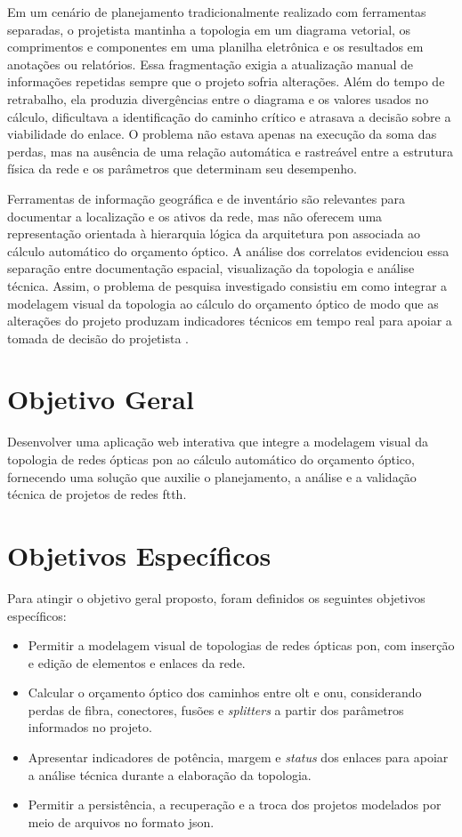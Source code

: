 Em um cenário de planejamento tradicionalmente realizado com ferramentas separadas, o projetista mantinha a topologia em um diagrama vetorial, os comprimentos e componentes em uma planilha eletrônica e os resultados em anotações ou relatórios. Essa fragmentação exigia a atualização manual de informações repetidas sempre que o projeto sofria alterações. Além do tempo de retrabalho, ela produzia divergências entre o diagrama e os valores usados no cálculo, dificultava a identificação do caminho crítico e atrasava a decisão sobre a viabilidade do enlace. O problema não estava apenas na execução da soma das perdas, mas na ausência de uma relação automática e rastreável entre a estrutura física da rede e os parâmetros que determinam seu desempenho.

Ferramentas de informação geográfica e de inventário são relevantes para documentar a localização e os ativos da rede, mas não oferecem uma representação orientada à hierarquia lógica da arquitetura \gls{pon} associada ao cálculo automático do orçamento óptico. A análise dos correlatos evidenciou essa separação entre documentação espacial, visualização da topologia e análise técnica. Assim, o problema de pesquisa investigado consistiu em como integrar a modelagem visual da topologia ao cálculo do orçamento óptico de modo que as alterações do projeto produzam indicadores técnicos em tempo real para apoiar a tomada de decisão do projetista \cite{munzner2014visualization,keiser2011pon}.

\section{Objetivo Geral}

Desenvolver uma aplicação web interativa que integre a modelagem visual da topologia de redes ópticas \gls{pon} ao cálculo automático do orçamento óptico, fornecendo uma solução que auxilie o planejamento, a análise e a validação técnica de projetos de redes \gls{ftth}.

\section{Objetivos Específicos}

Para atingir o objetivo geral proposto, foram definidos os seguintes objetivos específicos:

\begin{itemize}
  \item Permitir a modelagem visual de topologias de redes ópticas \gls{pon}, com inserção e edição de elementos e enlaces da rede.
  \item Calcular o orçamento óptico dos caminhos entre \gls{olt} e \gls{onu}, considerando perdas de fibra, conectores, fusões e \textit{splitters} a partir dos parâmetros informados no projeto.
  \item Apresentar indicadores de potência, margem e \textit{status} dos enlaces para apoiar a análise técnica durante a elaboração da topologia.
  \item Permitir a persistência, a recuperação e a troca dos projetos modelados por meio de arquivos no formato \gls{json}.
\end{itemize}

